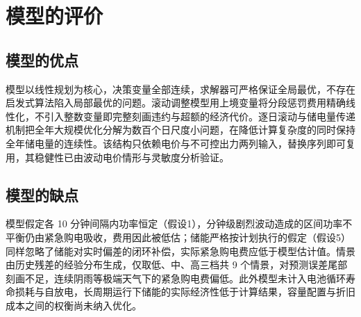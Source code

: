 
\section{模型的评价}

\subsection{模型的优点}

模型以线性规划为核心，决策变量全部连续，求解器可严格保证全局最优，不存在启发式算法陷入局部最优的问题。滚动调整模型用上境变量将分段惩罚费用精确线性化，不引入整数变量即完整刻画违约与超额的经济代价。逐日滚动与储电量传递机制把全年大规模优化分解为数百个日尺度小问题，在降低计算复杂度的同时保持全年储电量的连续性。该结构只依赖电价与不可控出力两列输入，替换序列即可复用，其稳健性已由波动电价情形与灵敏度分析验证。

\subsection{模型的缺点}

模型假定各 10 分钟间隔内功率恒定（假设1），分钟级剧烈波动造成的区间功率不平衡仍由紧急购电吸收，费用因此被低估；储能严格按计划执行的假定（假设5）同样忽略了储能对实时偏差的闭环补偿，实际紧急购电费应低于模型估计值。情景由历史残差的经验分布生成，仅取低、中、高三档共 9 个情景，对预测误差尾部刻画不足，连续阴雨等极端天气下的紧急购电费偏低。此外模型未计入电池循环寿命损耗与自放电，长周期运行下储能的实际经济性低于计算结果，容量配置与折旧成本之间的权衡尚未纳入优化。
